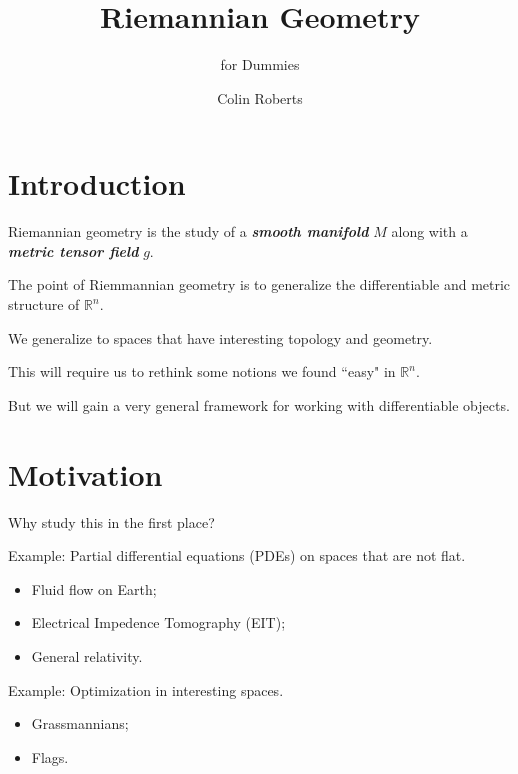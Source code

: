 \documentclass[UKenglish]{beamer}
\author{Colin Roberts}
\title{Riemannian Geometry}
\subtitle{for Dummies}
\newcommand\boldgreen[1]{\textcolor{lighter_csu_green}{\emph{\textbf{#1}}}}
\newcommand{\R}{\mathbb{R}}
\begin{document}
\section{Introduction}

\begin{frame}{}
	\vfill
	\large{Riemannian geometry} is the study of a \boldgreen{smooth manifold} $M$ along with a \boldgreen{metric tensor field} $g$. 
	\vfill
\end{frame}

\begin{frame}{}
	\vfill
	The point of Riemmannian geometry is to generalize the differentiable and metric structure of $\R^n$.
	\vfill
\end{frame}

\begin{frame}{}
	\vfill
	We generalize to spaces that have interesting topology and geometry.
	\vfill
\end{frame}

\begin{frame}{}
	\vfill
	This will require us to rethink some notions we found ``easy" in $\R^n$.
	\vfill
\end{frame}

\begin{frame}{}
	\vfill
	But we will gain a very general framework for working with differentiable objects.
	\vfill
\end{frame}

\section{Motivation}

\begin{frame}{}
	\vfill
	Why study this in the first place?
	\vfill
\end{frame}

\begin{frame}{}
	\vfill
	Example: Partial differential equations (PDEs) on spaces that are not flat.
	\pause
	\begin{itemize}
		\item Fluid flow on Earth;
		\pause
		\item Electrical Impedence Tomography (EIT);
		\pause
		\item General relativity.
	\end{itemize}
	\vfill
\end{frame}

\begin{frame}{}
	\vfill
	Example: Optimization in interesting spaces.
	\pause
	\begin{itemize}
		\item Grassmannians;
		\pause
		\item Flags.
	\end{itemize}
	\vfill
\end{frame}
\end{document}
